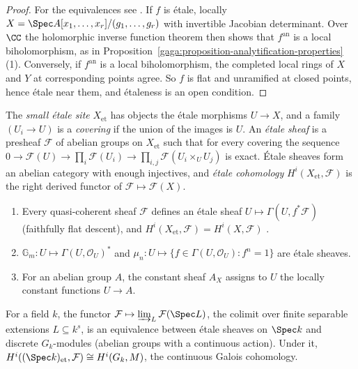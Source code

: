\begin{proof}
For the equivalences see \cite[Chapter I]{milne-etale}. If $f$ is \'etale, locally $X = \Spec A[x_1, \ldots, x_r]/(g_1, \ldots, g_r)$ with invertible Jacobian determinant. Over
$\CC$ the holomorphic inverse function theorem then shows that $f^{\mathrm{an}}$ is a local biholomorphism, as in Proposition~\ref{gaga:proposition-analytification-properties}(1).
Conversely, if $f^{\mathrm{an}}$ is a local biholomorphism, the completed local rings of $X$ and $Y$ at corresponding points agree. So $f$ is flat and unramified at closed points, hence
\'etale near them, and \'etaleness is an open condition.
\end{proof}

\begin{definition}\label{etale-cohomology:definition-etale-site}
The \emph{small \'etale site} $X_{\mathrm{et}}$ has objects the \'etale morphisms $U \to X$, and a family $(U_i \to U)$ is a \emph{covering} if the union of the images is $U$. An \emph{\'etale
sheaf} is a presheaf $\mathcal{F}$ of abelian groups on $X_{\mathrm{et}}$ such that for every covering the sequence
$0 \to \mathcal{F}(U) \to \prod_i\mathcal{F}(U_i) \to \prod_{i,j}\mathcal{F}(U_i \times_UU_j)$ is exact. \'Etale sheaves form an abelian category with enough injectives, and
\emph{\'etale cohomology} $H^i(X_{\mathrm{et}}, \mathcal{F})$ is the right derived functor of $\mathcal{F} \mapsto \mathcal{F}(X)$.
\end{definition}

\begin{example}\label{etale-cohomology:example-etale-sheaves}
\begin{enumerate}
\item Every quasi-coherent sheaf $\mathcal{F}$ defines an \'etale sheaf $U \mapsto \Gamma(U, f^*\mathcal{F})$ (faithfully flat descent), and $H^i(X_{\mathrm{et}}, \mathcal{F}) = H^i(X, \mathcal{F})$
\cite[Chapter III]{milne-etale}.
\item $\mathbb{G}_m \colon U \mapsto \Gamma(U, \mathcal{O}_U)^*$ and $\mu_n \colon U \mapsto \{f \in \Gamma(U, \mathcal{O}_U) : f^n = 1\}$ are \'etale sheaves.
\item For an abelian group $A$, the constant sheaf $A_X$ assigns to $U$ the locally constant functions $U \to A$.
\end{enumerate}
\end{example}

\begin{proposition}\label{etale-cohomology:proposition-galois}
For a field $k$, the functor $\mathcal{F} \mapsto \varinjlim_{L}\mathcal{F}(\Spec L)$, the colimit over finite separable extensions $L \subseteq k^s$, is an equivalence between \'etale sheaves on
$\Spec k$ and discrete $G_k$-modules (abelian groups with a continuous action). Under it, $H^i((\Spec k)_{\mathrm{et}}, \mathcal{F}) \cong H^i(G_k, M)$, the continuous Galois cohomology.
\end{proposition}

